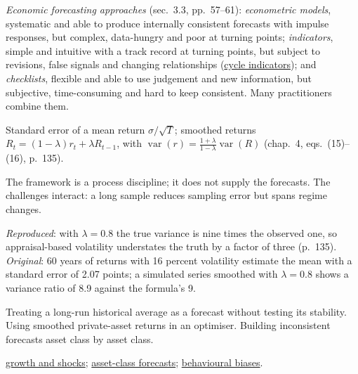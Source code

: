 \begin{qfmethod}
\emph{Economic forecasting approaches} (sec.~3.3, pp.~57--61): \emph{econometric models}, systematic and able to produce internally consistent forecasts with impulse responses, but complex, data-hungry and poor at turning points; \emph{indicators}, simple and intuitive with a track record at turning points, but subject to revisions, false signals and changing relationships (\hyperref[meth:business-cycle-indicators]{cycle indicators}); and \emph{checklists}, flexible and able to use judgement and new information, but subjective, time-consuming and hard to keep consistent. Many practitioners combine them.

 Standard error of a mean return $\sigma/\sqrt{T}$; smoothed returns $R_t=(1-\lambda)r_t+\lambda R_{t-1}$, with $\operatorname{var}(r)=\frac{1+\lambda}{1-\lambda}\operatorname{var}(R)$ (chap.~4, eqs.~(15)--(16), p.~135).

 The framework is a process discipline; it does not supply the forecasts. The challenges interact: a long sample reduces sampling error but spans regime changes.

 \emph{Reproduced}: with $\lambda=0.8$ the true variance is nine times the observed one, so appraisal-based volatility understates the truth by a factor of three (p.~135). \emph{Original}: 60 years of returns with 16 percent volatility estimate the mean with a standard error of 2.07 points; a simulated series smoothed with $\lambda=0.8$ shows a variance ratio of 8.9 against the formula's 9.

 Treating a long-run historical average as a forecast without testing its stability. Using smoothed private-asset returns in an optimiser. Building inconsistent forecasts asset class by asset class.

 \hyperref[meth:growth-shocks-long-run-expectations]{growth and shocks}; \hyperref[meth:asset-class-return-forecasts]{asset-class forecasts}; \hyperref[def:behavioural-biases]{behavioural biases}.

\end{qfmethod}

